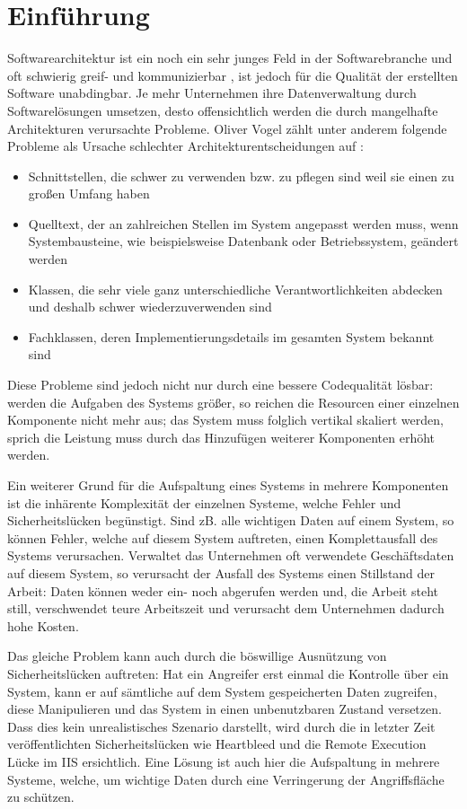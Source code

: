 \chapter{Einführung}
Softwarearchitektur ist ein noch ein sehr junges Feld in der Softwarebranche und oft schwierig greif- und kommunizierbar \cite[S. 8]{softarch}, ist jedoch für die Qualität der erstellten Software unabdingbar. Je mehr Unternehmen ihre Datenverwaltung durch Softwarelösungen umsetzen, desto offensichtlich werden die durch mangelhafte Architekturen verursachte Probleme. Oliver Vogel zählt unter anderem folgende Probleme als Ursache schlechter Architekturentscheidungen auf \cite[S. 7]{softwarch}:

\begin{itemize}
  \item \glqq Schnittstellen, die schwer zu verwenden bzw. zu pflegen sind weil sie einen zu großen Umfang haben\grqq
  \item \glqq Quelltext, der an zahlreichen Stellen im System angepasst werden muss, wenn Systembausteine, wie beispielsweise Datenbank oder Betriebssystem, geändert werden\grqq
  \item \glqq Klassen, die sehr viele ganz unterschiedliche Verantwortlichkeiten abdecken und deshalb schwer wiederzuverwenden sind\grqq
  \item \glqq Fachklassen, deren Implementierungsdetails im gesamten System bekannt sind\grqq
\end{itemize}

Diese Probleme sind jedoch nicht nur durch eine bessere Codequalität lösbar: werden die Aufgaben des Systems größer, so reichen die Resourcen einer einzelnen Komponente nicht mehr aus; das System muss folglich vertikal skaliert werden, sprich die Leistung muss durch das Hinzufügen weiterer Komponenten erhöht werden.

Ein weiterer Grund für die Aufspaltung eines Systems in mehrere Komponenten ist die inhärente Komplexität der einzelnen Systeme, welche Fehler und Sicherheitslücken begünstigt. Sind zB. alle wichtigen Daten auf einem System, so können Fehler, welche auf diesem System auftreten, einen Komplettausfall des Systems verursachen. Verwaltet das Unternehmen oft verwendete Geschäftsdaten auf diesem System, so verursacht der Ausfall des Systems einen Stillstand der Arbeit: Daten können weder ein- noch abgerufen werden und, die Arbeit steht still, verschwendet teure Arbeitszeit und verursacht dem Unternehmen dadurch hohe Kosten.

Das gleiche Problem kann auch durch die böswillige Ausnützung von Sicherheitslücken auftreten: Hat ein Angreifer erst einmal die Kontrolle über ein System, kann er auf sämtliche auf dem System gespeicherten Daten zugreifen, diese Manipulieren und das System in einen unbenutzbaren Zustand versetzen. Dass dies kein unrealistisches Szenario darstellt, wird durch die in letzter Zeit veröffentlichten Sicherheitslücken wie Heartbleed\cite{heartbleed} und die Remote Execution Lücke im IIS ersichtlich\cite{iis}. Eine Lösung ist auch hier die Aufspaltung in mehrere Systeme, welche, um wichtige Daten durch eine Verringerung der Angriffsfläche zu schützen.

